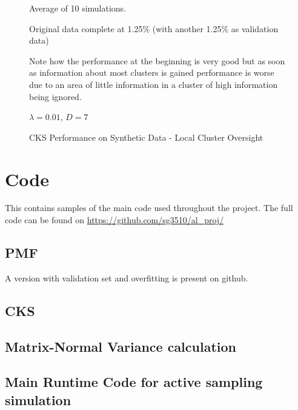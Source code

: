 \begin{figure}[!htbp]
  \begin{center}
  \resizebox{\textwidth}{!}{}
Average of 10 simulations.
\end{center}
Original data complete at 1.25\% (with another 1.25\% as validation data)

Note how the performance at the beginning is very good but as soon as information about most clusters is gained performance is worse due to an area of little information in a cluster of high information being ignored.

$\lambda = 0.01$, $D=7$
    \caption{CKS Performance on Synthetic Data - Local Cluster Oversight}
    \label{fig:cks_end_synth}
\end{figure}

\section{Code}

This contains samples of the main code used throughout the project. The full code can be found on \url{https://github.com/sg3510/al_proj/}
\subsection{PMF}
A version with validation set and overfitting is present on github.


\subsection{CKS}


\subsection{Matrix-Normal Variance calculation}








\subsection{Main Runtime Code for active sampling simulation}


